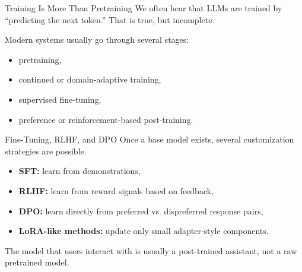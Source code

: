 \documentclass[12pt]{beamer}
\begin{document}
\begin{frame}{Training Is More Than Pretraining}
  We often hear that LLMs are trained by ``predicting the next token.'' That is true, but incomplete.

  Modern systems usually go through several stages:
  \begin{itemize}
    \item pretraining,
    \item continued or domain-adaptive training,
    \item supervised fine-tuning,
    \item preference or reinforcement-based post-training.
  \end{itemize}
\end{frame}

\begin{frame}{Fine-Tuning, RLHF, and DPO}
  Once a base model exists, several customization strategies are possible.

  \begin{itemize}
    \item \textbf{SFT:} learn from demonstrations,
    \item \textbf{RLHF:} learn from reward signals based on feedback,
    \item \textbf{DPO:} learn directly from preferred vs.
    dispreferred response pairs,
    \item \textbf{LoRA-like methods:} update only small adapter-style components.
  \end{itemize}

  The model that users interact with is usually a post-trained assistant, not a raw pretrained model.
\end{frame}
\end{document}
